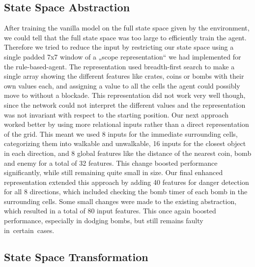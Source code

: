 \documentclass{article} %
\begin{document}
	\newpage
	
	\subsection{State Space Abstraction}
	After training the vanilla model on the full state space given by the environment, we could tell that the full state space was too large to efficiently train the agent. Therefore we tried to reduce the input by restricting our state space using a single padded 7x7 window of a „scope representation“ we had implemented for the rule-based-agent. The representation used breadth-first search to make a single array showing the different features like crates, coins or bombs with their own values each, and assigning a value to all the cells the agent could possibly move to without a blockade. This representation did not work very well though, since the network could not interpret the different values and the representation was not invariant with respect to the starting position. 
	Our next approach worked better by using more relational inputs rather than a direct representation of the grid. This meant we used 8 inputs for the immediate surrounding cells, categorizing them into walkable and unwalkable, 16 inputs for the closest object in each direction, and 8 global features like the distance of the nearest coin, bomb and enemy for a total of 32 features. This change boosted performance significantly, while still remaining quite small in size. 
	Our final enhanced representation extended this approach by adding 40 features for danger detection for all 8 directions, which included checking the bomb timer of each bomb in the surrounding cells. Some small changes were made to the existing abstraction, which resulted in a total of 80 input features. This once again boosted performance, especially in dodging bombs, but still remains faulty in certain cases.
	
	\subsection{State Space Transformation}
\end{document}
